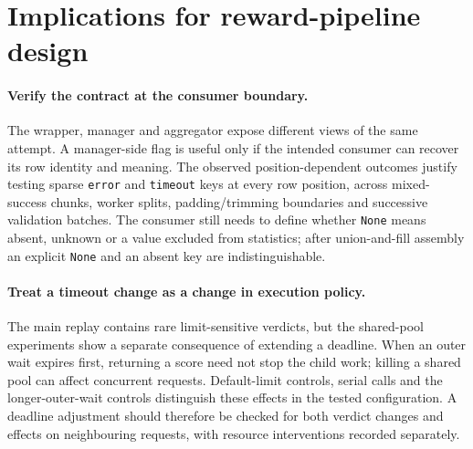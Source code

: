 \documentclass[10pt,a4paper]{article}
\begin{document}
\section{Implications for reward-pipeline design}
\label{sec:implications}

\paragraph{Verify the contract at the consumer boundary.}
The wrapper, manager and aggregator expose different views of the same
attempt. A manager-side flag is useful only if the intended consumer can
recover its row identity and meaning. The observed position-dependent
outcomes justify testing sparse \texttt{error} and \texttt{timeout} keys at
every row position, across mixed-success chunks, worker splits,
padding/trimming boundaries and successive validation batches. The consumer
still needs to define whether \texttt{None} means absent, unknown or a value
excluded from statistics; after union-and-fill assembly an explicit
\texttt{None} and an absent key are indistinguishable.

\paragraph{Treat a timeout change as a change in execution policy.}
The main replay contains rare limit-sensitive verdicts, but the shared-pool
experiments show a separate consequence of extending a deadline. When an
outer wait expires first, returning a score need not stop the child work;
killing a shared pool can affect concurrent requests. Default-limit
controls, serial calls and the longer-outer-wait controls distinguish these
effects in the tested configuration. A deadline adjustment should therefore
be checked for both verdict changes and effects on neighbouring requests,
with resource interventions recorded separately.
\end{document}
